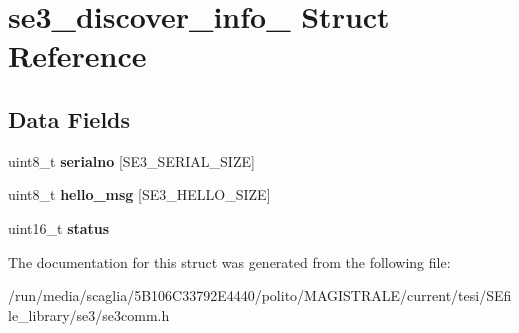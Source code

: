 \hypertarget{structse3__discover__info__}{\section{se3\-\_\-discover\-\_\-info\-\_\- Struct Reference}
\label{structse3__discover__info__}
}
\subsection*{Data Fields}
\begin{DoxyCompactItemize}
\item 
\hypertarget{structse3__discover__info___a38c1b44c1e10dd5a42aeae1651b30b78}{uint8\-\_\-t {\bfseries serialno} \mbox{[}S\-E3\-\_\-\-S\-E\-R\-I\-A\-L\-\_\-\-S\-I\-Z\-E\mbox{]}}\label{structse3__discover__info___a38c1b44c1e10dd5a42aeae1651b30b78}

\item 
\hypertarget{structse3__discover__info___a08edaf5942880bcaff302a80953a9000}{uint8\-\_\-t {\bfseries hello\-\_\-msg} \mbox{[}S\-E3\-\_\-\-H\-E\-L\-L\-O\-\_\-\-S\-I\-Z\-E\mbox{]}}\label{structse3__discover__info___a08edaf5942880bcaff302a80953a9000}

\item 
\hypertarget{structse3__discover__info___a12ad37b852a6d74bd0bf967dcada760f}{uint16\-\_\-t {\bfseries status}}\label{structse3__discover__info___a12ad37b852a6d74bd0bf967dcada760f}

\end{DoxyCompactItemize}


The documentation for this struct was generated from the following file\-:\begin{DoxyCompactItemize}
\item 
/run/media/scaglia/5\-B106\-C33792\-E4440/polito/\-M\-A\-G\-I\-S\-T\-R\-A\-L\-E/current/tesi/\-S\-Efile\-\_\-library/se3/se3comm.\-h\end{DoxyCompactItemize}
